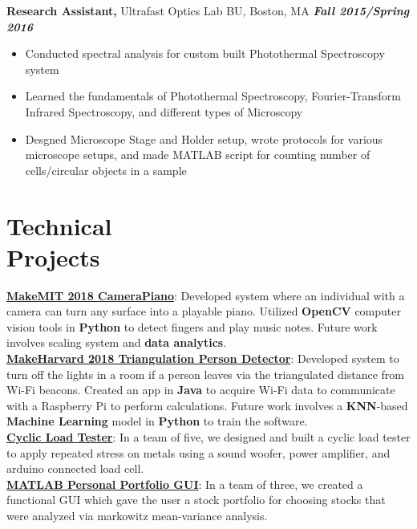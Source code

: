 \documentclass[margin]{res}
\begin{document}
\begin{resume}
{\bf Research Assistant,} Ultrafast Optics Lab BU, Boston, MA \hfill \textbf{\textit{Fall 2015/Spring 2016}}
			\begin{itemize} \itemsep -2pt
			\item  Conducted spectral analysis for custom built Photothermal Spectroscopy system
			\item Learned the fundamentals of Photothermal Spectroscopy, Fourier-Transform Infrared Spectroscopy, and different types of Microscopy 
			\item Desgned Microscope Stage and Holder setup, wrote protocols for various microscope setups, and made MATLAB script for counting number of cells/circular objects in a sample
			\end{itemize}
			
\section{Technical \\ Projects} 
\textbf{\underline{MakeMIT 2018 CameraPiano}}: Developed system where an individual with a camera can turn any surface into a playable piano. Utilized \textbf{OpenCV} computer vision tools in \textbf{Python} to detect fingers and play music notes. Future work involves scaling system and \textbf{data analytics}.\\
\textbf{\underline{MakeHarvard 2018 Triangulation Person Detector}}: Developed system to turn off the lights in a room if a person leaves via the triangulated distance from Wi-Fi beacons. Created an app in \textbf{Java} to acquire Wi-Fi data to communicate with a Raspberry Pi to perform calculations. Future work involves a \textbf{KNN}-based \textbf{Machine Learning} model in \textbf{Python} to train the software. \\
\textbf{\underline{Cyclic Load Tester}}: In a team of five, we designed and built a cyclic load tester to apply repeated stress on metals using a sound woofer, power amplifier, and arduino connected load cell. \\
\textbf{\underline{MATLAB Personal Portfolio GUI}}: In a team of three, we created a functional GUI which gave the user a stock portfolio for choosing stocks that were analyzed via markowitz mean-variance analysis. 			
			
			
			
			
			

\end{resume}
\end{document}
